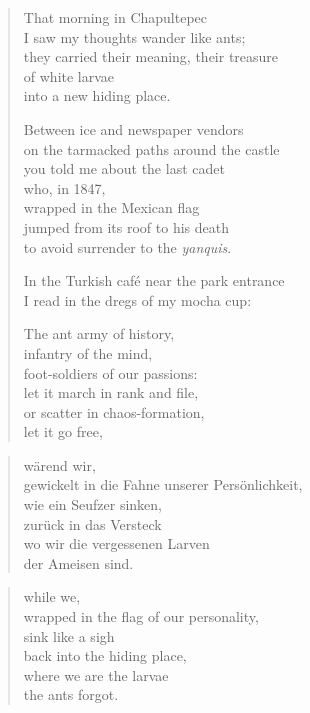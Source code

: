 \begin{verse}

That morning in Chapultepec\\
I saw my thoughts wander like ants;\\
they carried their meaning, their treasure\\
of white larvae\\
into a new hiding place.

Between ice and newspaper vendors\\
on the tarmacked paths around the castle\\
you told me about the last cadet\\
who, in 1847,\\
wrapped in the Mexican flag\\
jumped from its roof to his death\\
to avoid surrender to the \emph{yanquis}.

In the Turkish café near the park entrance\\
I read in the dregs of my mocha cup:

The ant army of history,\\
infantry of the mind,\\
foot-soldiers of our passions:\\
let it march in rank and file,\\
or scatter in chaos-formation,\\
let it go free,

\end{verse}

\clearpage

\begin{verse}

wärend wir,\\
gewickelt in die Fahne unserer Persönlichkeit,\\
wie ein Seufzer sinken,\\
zurück in das Versteck\\
wo wir die vergessenen Larven\\
der Ameisen sind.

\end{verse}

\clearpage

\begin{verse}
while we,\\
wrapped in the flag of our personality,\\
sink like a sigh\\
back into the hiding place,\\
where we are the larvae\\
the ants forgot.

\end{verse}

